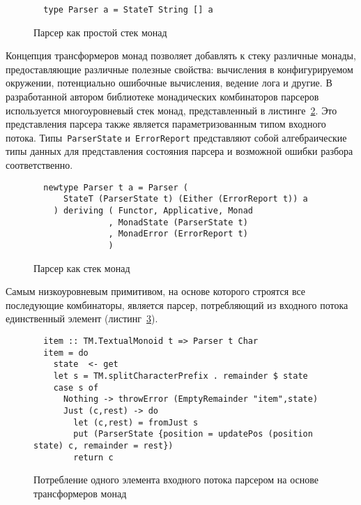   \begin{figure}[h]
  \begin{lstlisting}
  type Parser a = StateT String [] a
  \end{lstlisting}
  \caption{Парсер как простой стек монад}
  \label{listing:monadStackParserType}
  \end{figure}

  Концепция трансформеров монад позволяет добавлять к стеку различные монады, 
  предоставляющие различные полезные свойства: вычисления в конфигурируемом окружении, 
  потенциально ошибочные вычисления, ведение лога и другие. В разработанной автором 
  библиотеке монадических комбинаторов парсеров~\cite{mdParse} используется многоуровневый 
  стек монад, представленный в листинге~\ref{listing:hugeMonadStackParserType}. Это 
  представления парсера также является параметризованным типом входного потока.
  Типы~\lstinline{ParserState} и~\lstinline{ErrorReport} представляют собой 
  алгебраические типы данных для представления состояния парсера и возможной 
  ошибки разбора соответственно.

  \begin{figure}[h]
  \begin{lstlisting}
  newtype Parser t a = Parser (  
      StateT (ParserState t) (Either (ErrorReport t)) a
    ) deriving ( Functor, Applicative, Monad
               , MonadState (ParserState t)
               , MonadError (ErrorReport t)
               )
  \end{lstlisting}
  \caption{Парсер как стек монад}
  \label{listing:hugeMonadStackParserType}
  \end{figure}

  Самым низкоуровневым примитивом, на основе которого строятся все последующие 
  комбинаторы, является парсер, потребляющий из входного потока единственный элемент
  (листинг~\ref{listing:mtlParsersItem}).

  \begin{figure}[h]
  \begin{lstlisting}
  item :: TM.TextualMonoid t => Parser t Char
  item = do
    state  <- get
    let s = TM.splitCharacterPrefix . remainder $ state
    case s of 
      Nothing -> throwError (EmptyRemainder "item",state)
      Just (c,rest) -> do  
        let (c,rest) = fromJust s
        put (ParserState {position = updatePos (position state) c, remainder = rest})
        return c  
  \end{lstlisting}
  \caption{Потребление одного элемента входного потока парсером на основе трансформеров 
  монад}
  \label{listing:mtlParsersItem}
  \end{figure} 

